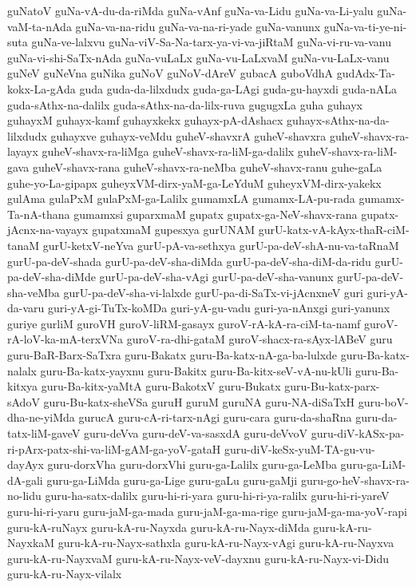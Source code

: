 {guNatoV
guNa-vA-du-da-riMda
guNa-vAnf
guNa-va-Lidu
guNa-va-Li-yalu
guNa-vaM-ta-nAda
guNa-va-na-ridu
guNa-va-na-ri-yade
guNa-vanunx
guNa-va-ti-ye-ni-suta
guNa-ve-lalxvu
guNa-viV-Sa-Na-tarx-ya-vi-va-jiRtaM
guNa-vi-ru-va-vanu
guNa-vi-shi-SaTx-nAda
guNa-vuLaLx
guNa-vu-LaLxvaM
guNa-vu-LaLx-vanu
guNeV
guNeVna
guNika
guNoV
guNoV-dAreV
gubacA
guboVdhA
gudAdx-Ta-kokx-La-gAda
guda
guda-da-lilxdudx
guda-ga-LAgi
guda-gu-hayxdi
guda-nALa
guda-sAthx-na-dalilx
guda-sAthx-na-da-lilx-ruva
gugugxLa
guha
guhayx
guhayxM
guhayx-kamf
guhayxkekx
guhayx-pA-dAshacx
guhayx-sAthx-na-da-lilxdudx
guhayxve
guhayx-veMdu
guheV-shavxrA
guheV-shavxra
guheV-shavx-ra-layayx
guheV-shavx-ra-liMga
guheV-shavx-ra-liM-ga-dalilx
guheV-shavx-ra-liM-gava
guheV-shavx-rana
guheV-shavx-ra-neMba
guheV-shavx-ranu
guhe-gaLa
guhe-yo-La-gipapx
guheyxVM-dirx-yaM-ga-LeYduM
guheyxVM-dirx-yakekx
gulAma
gulaPxM
gulaPxM-ga-Lalilx
gumamxLA
gumamx-LA-pu-rada
gumamx-Ta-nA-thana
gumamxsi
guparxmaM
gupatx
gupatx-ga-NeV-shavx-rana
gupatx-jAcnx-na-vayayx
gupatxmaM
gupesxya
gurUNAM
gurU-katx-vA-kAyx-thaR-ciM-tanaM
gurU-ketxV-neYva
gurU-pA-va-sethxya
gurU-pa-deV-shA-nu-va-taRnaM
gurU-pa-deV-shada
gurU-pa-deV-sha-diMda
gurU-pa-deV-sha-diM-da-ridu
gurU-pa-deV-sha-diMde
gurU-pa-deV-sha-vAgi
gurU-pa-deV-sha-vanunx
gurU-pa-deV-sha-veMba
gurU-pa-deV-sha-vi-lalxde
gurU-pa-di-SaTx-vi-jAcnxneV
guri
guri-yA-da-varu
guri-yA-gi-TuTx-koMDa
guri-yA-gu-vadu
guri-ya-nAnxgi
guri-yanunx
guriye
gurliM
guroVH
guroV-liRM-gasayx
guroV-rA-kA-ra-ciM-ta-namf
guroV-rA-loV-ka-mA-terxVNa
guroV-ra-dhi-gataM
guroV-shacx-ra-sAyx-lABeV
guru
guru-BaR-Barx-SaTxra
guru-Bakatx
guru-Ba-katx-nA-ga-ba-lulxde
guru-Ba-katx-nalalx
guru-Ba-katx-yayxnu
guru-Bakitx
guru-Ba-kitx-seV-vA-nu-kUli
guru-Ba-kitxya
guru-Ba-kitx-yaMtA
guru-BakotxV
guru-Bukatx
guru-Bu-katx-parx-sAdoV
guru-Bu-katx-sheVSa
guruH
guruM
guruNA
guru-NA-diSaTxH
guru-boV-dha-ne-yiMda
gurucA
guru-cA-ri-tarx-nAgi
guru-cara
guru-da-shaRna
guru-da-tatx-liM-gaveV
guru-deVva
guru-deV-va-sasxdA
guru-deVvoV
guru-diV-kASx-pa-ri-pArx-patx-shi-va-liM-gAM-ga-yoV-gataH
guru-diV-keSx-yuM-TA-gu-vu-dayAyx
guru-dorxVha
guru-dorxVhi
guru-ga-Lalilx
guru-ga-LeMba
guru-ga-LiM-dA-gali
guru-ga-LiMda
guru-ga-Lige
guru-gaLu
guru-gaMji
guru-go-heV-shavx-ra-no-lidu
guru-ha-satx-dalilx
guru-hi-ri-yara
guru-hi-ri-ya-ralilx
guru-hi-ri-yareV
guru-hi-ri-yaru
guru-jaM-ga-mada
guru-jaM-ga-ma-rige
guru-jaM-ga-ma-yoV-rapi
guru-kA-ruNayx
guru-kA-ru-Nayxda
guru-kA-ru-Nayx-diMda
guru-kA-ru-NayxkaM
guru-kA-ru-Nayx-sathxla
guru-kA-ru-Nayx-vAgi
guru-kA-ru-Nayxva
guru-kA-ru-NayxvaM
guru-kA-ru-Nayx-veV-dayxnu
guru-kA-ru-Nayx-vi-Didu
guru-kA-ru-Nayx-vilalx
}
